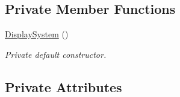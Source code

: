 \subsection*{Private Member Functions}
\begin{DoxyCompactItemize}
\item 
\mbox{\label{class_display_system_a813a263f459e0b728316cb392c78bd6e}} 
\mbox{\hyperlink{class_display_system_a813a263f459e0b728316cb392c78bd6e}{Display\+System}} ()
\begin{DoxyCompactList}\small\item\em Private default constructor. \end{DoxyCompactList}\end{DoxyCompactItemize}
\subsection*{Private Attributes}
